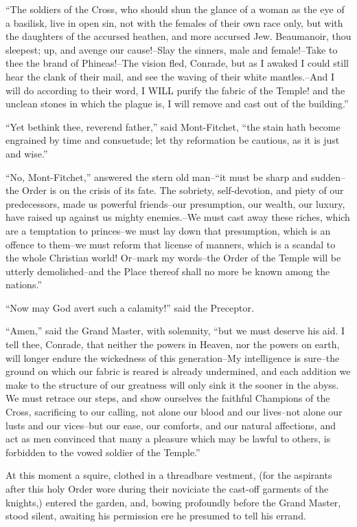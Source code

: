 ``The soldiers of the Cross, who should shun the glance of a woman as
the eye of a basilisk, live in open sin, not with the females of their
own race only, but with the daughters of the accursed heathen, and more
accursed Jew. Beaumanoir, thou sleepest; up, and avenge our cause!--Slay
the sinners, male and female!--Take to thee the brand of Phineas!--The
vision fled, Conrade, but as I awaked I could still hear the clank of
their mail, and see the waving of their white mantles.--And I will do
according to their word, I WILL purify the fabric of the Temple! and the
unclean stones in which the plague is, I will remove and cast out of the
building.''

``Yet bethink thee, reverend father,'' said Mont-Fitchet, ``the stain
hath become engrained by time and consuetude; let thy reformation be
cautious, as it is just and wise.''

``No, Mont-Fitchet,'' answered the stern old man--``it must be sharp and
sudden--the Order is on the crisis of its fate. The sobriety,
self-devotion, and piety of our predecessors, made us powerful
friends--our presumption, our wealth, our luxury, have raised up against
us mighty enemies.--We must cast away these riches, which are a
temptation to princes--we must lay down that presumption, which is an
offence to them--we must reform that license of manners, which is a
scandal to the whole Christian world! Or--mark my words--the Order of
the Temple will be utterly demolished--and the Place thereof shall no
more be known among the nations.''

``Now may God avert such a calamity!'' said the Preceptor.

``Amen,'' said the Grand Master, with solemnity, ``but we must deserve
his aid. I tell thee, Conrade, that neither the powers in Heaven, nor
the powers on earth, will longer endure the wickedness of this
generation--My intelligence is sure--the ground on which our fabric is
reared is already undermined, and each addition we make to the structure
of our greatness will only sink it the sooner in the abyss. We must
retrace our steps, and show ourselves the faithful Champions of the
Cross, sacrificing to our calling, not alone our blood and our
lives--not alone our lusts and our vices--but our ease, our comforts,
and our natural affections, and act as men convinced that many a
pleasure which may be lawful to others, is forbidden to the vowed
soldier of the Temple.''

At this moment a squire, clothed in a threadbare vestment, (for the
aspirants after this holy Order wore during their noviciate the cast-off
garments of the knights,) entered the garden, and, bowing profoundly
before the Grand Master, stood silent, awaiting his permission ere he
presumed to tell his errand.

